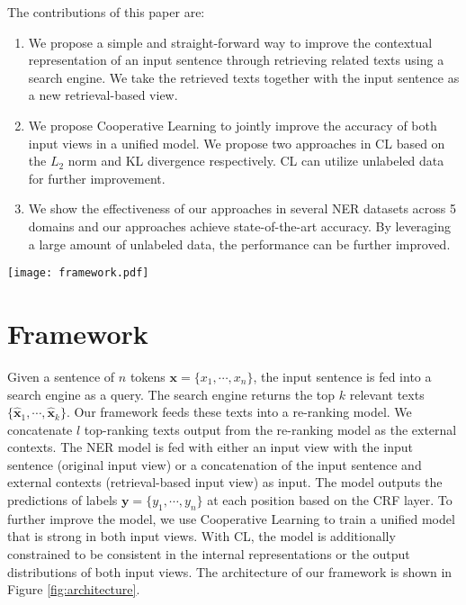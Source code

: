 \documentclass[11pt,a4paper]{article}
\def\vx{{\bm{x}}}
\def\vy{{\bm{y}}}
\newcommand{\xvec}{\mathbf{x}}
\newcommand{\mcL}{\mathcal{L}}
\begin{document}
The contributions of this paper are:
\begin{enumerate}[leftmargin=*]
    \item We propose a simple and straight-forward way to improve the contextual representation of an input sentence through retrieving related texts using a search engine. We take the retrieved texts together with the input sentence as a new retrieval-based view.
    \item 
We propose Cooperative Learning to jointly improve the accuracy of both input views in a unified model. We propose two approaches in CL based on the $L_2$ norm and KL divergence respectively. CL can utilize unlabeled data for further improvement.
\item We show the effectiveness of our approaches in several NER datasets across 5 domains and our approaches achieve state-of-the-art accuracy. By leveraging a large amount of unlabeled data, the performance can be further improved. \end{enumerate}
\begin{figure*}[ht]
	\centering
	\texttt{[image: framework.pdf]}
	\caption{The architecture of our framework. An input sentence $\xvec$ is fed into a search engine to get $k$ related texts. The related texts are then fed into the re-ranking module. The framework selects $l$ highest ranking related texts output from the re-ranking module and feeds the texts to a transformer-based model together with the input sentence. Finally, we calculate the negative likelihood loss $\mcL_{\text{NLL}}$ and $\mcL_{\text{NLL-EXT}}$ together with the CL loss (either $\mcL_{\text{CL-}L_2}$ or $\mcL_{\text{CL-KL}}$).}
	\label{fig:architecture}
\end{figure*}

\section{Framework}
Given a sentence of $n$ tokens $\vx = \{x_1, \cdots, x_n\}$, the input sentence is fed into a search engine as a query. The search engine returns the top $k$ relevant texts $\{\hat{\vx}_1, \cdots, \hat{\vx}_k\}$. Our framework feeds these texts into a re-ranking model. We concatenate $l$ top-ranking texts output from the re-ranking model as the external contexts. The NER model is fed with either an input view with the input sentence (original input view) or a concatenation of the input sentence and external contexts (retrieval-based input view) as input. The model outputs the predictions of labels $\vy = \{y_1, \cdots, y_n\}$ at each position based on the CRF layer. To further improve the model, we use Cooperative Learning to train a unified model that is strong in both input views. With CL, the model is additionally constrained to be consistent in the internal representations or the output distributions of both input views. The architecture of our framework is shown in Figure \ref{fig:architecture}.
\end{document}
